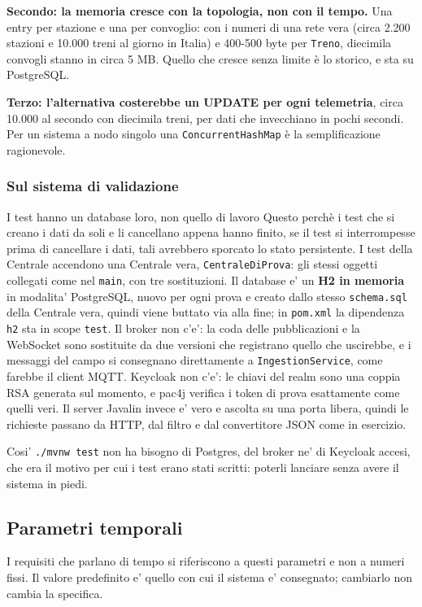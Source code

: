 \documentclass[11pt]{article}
\begin{document}
\textbf{Secondo: la memoria cresce con la topologia, non con il tempo.} Una entry per stazione e una per
convoglio: con i numeri di una rete vera (circa 2.200 stazioni e 10.000 treni al giorno in Italia)
e 400-500 byte per \texttt{Treno}, diecimila convogli stanno in circa 5 MB. Quello che cresce senza
limite è lo storico, e sta su PostgreSQL.

\textbf{Terzo: l'alternativa costerebbe un UPDATE per ogni telemetria}, circa 10.000 al secondo con
diecimila treni, per dati che invecchiano in pochi secondi. Per un sistema a nodo singolo una
\texttt{ConcurrentHashMap} è la semplificazione ragionevole.
\subsubsection{Sul sistema di validazione}
\label{sec:org71592ab}
I test hanno un database loro, non quello di lavoro
Questo perchè i test che si creano i dati da soli e li cancellano appena hanno finito, se il test si interrompesse prima di cancellare i dati, tali avrebbero sporcato lo stato persistente.
I test della Centrale accendono una Centrale vera, \texttt{CentraleDiProva}: gli stessi oggetti collegati
come nel \texttt{main}, con tre sostituzioni. Il database e' un \textbf{H2 in memoria} in modalita' PostgreSQL,
nuovo per ogni prova e creato dallo stesso \texttt{schema.sql} della Centrale vera, quindi viene buttato
via alla fine; in \texttt{pom.xml} la dipendenza \texttt{h2} sta in scope \texttt{test}. Il broker non c'e': la coda
delle pubblicazioni e la WebSocket sono sostituite da due versioni che registrano quello che
uscirebbe, e i messaggi del campo si consegnano direttamente a \texttt{IngestionService}, come farebbe il
client MQTT. Keycloak non c'e': le chiavi del realm sono una coppia RSA generata sul momento, e
pac4j verifica i token di prova esattamente come quelli veri. Il server Javalin invece e' vero e
ascolta su una porta libera, quindi le richieste passano da HTTP, dal filtro e dal convertitore
JSON come in esercizio.

Cosi' \texttt{./mvnw test} non ha bisogno di Postgres, del broker ne' di Keycloak accesi, che era il
motivo per cui i test erano stati scritti: poterli lanciare senza avere il sistema in piedi.
\subsection{Parametri temporali}
\label{sec:org4f591bc}

I requisiti che parlano di tempo si riferiscono a questi parametri e non a numeri fissi. Il valore
predefinito e' quello con cui il sistema e' consegnato; cambiarlo non cambia la specifica.
\end{document}
